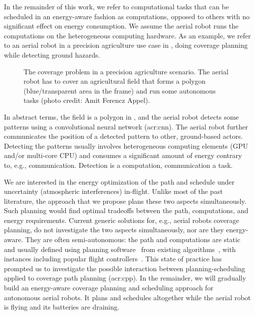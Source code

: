 In the remainder of this work, we refer to computational tasks that can be scheduled in an energy-aware fashion as computations, opposed to others with no significant effect on energy consumption. We assume the aerial robot runs the computations on the heterogeneous computing hardware. As an example, we refer to an aerial robot in a precision agriculture use case in , doing coverage planning while detecting ground hazards. 
\begin{figure}[h!]
  \centering
  
  \caption[The coverage problem in a precision agriculture scenario]{The coverage problem in a precision agriculture scenario. The aerial robot has to cover an agricultural field that forms a polygon (blue/transparent area in the frame) and run some autonomous tasks {\scriptsize(photo credit: Amit Ferencz Appel)}.}
  \label{fig:plot2}
\end{figure}
In abstract terms, the field is a polygon in , and the aerial robot detects some patterns using a convolutional neural network (\Gls{acr:cnn}). The aerial robot further communicates the position of a detected pattern to other, ground-based actors. Detecting the patterns usually involves heterogeneous computing elements (GPU and/or multi-core CPU) and consumes a significant amount of energy contrary to, e.g., communication. Detection is a computation, communication a task.

We are interested in the energy optimization of the path and schedule under uncertainty (atmospheric interferences) in-flight. Unlike most of the past literature, the approach that we propose plans these two aspects simultaneously. Such planning would find optimal tradeoffs between the path, computations, and energy requirements. Current generic solutions for, e.g., aerial robots coverage planning, do not investigate the two aspects simultaneously, nor are they energy-aware. They are often semi-autonomous: the path and computations are static and usually defined using planning software~\citep{daponte2019review} from existing algorithms~\citep{choset2001coverage,galceran2013survey}, with instances including popular flight controllers~\citep{px4,papa}.  This state of practice has prompted us to investigate the possible interaction between planning-scheduling applied to coverage path planning (\Gls{acr:cpp}). In the remainder, we will gradually build an energy-aware coverage planning and scheduling approach for autonomous aerial robots. It plans and schedules altogether while the aerial robot is flying and its batteries are draining.


